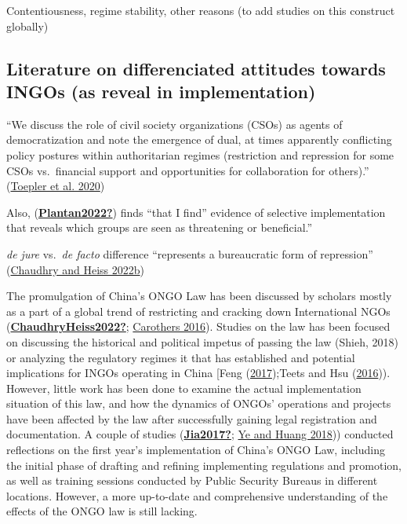 \documentclass[
]{article}
\begin{document}
Contentiousness, regime stability, other reasons (to add studies on this
construct globally)

\hypertarget{literature-on-differenciated-attitudes-towards-ingos-as-reveal-in-implementation}{%
\subsection{Literature on differenciated attitudes towards INGOs (as
reveal in
implementation)}\label{literature-on-differenciated-attitudes-towards-ingos-as-reveal-in-implementation}}

``We discuss the role of civil society organizations (CSOs) as agents of
democratization and note the emergence of dual, at times apparently
conflicting policy postures within authoritarian regimes (restriction
and repression for some CSOs vs.~financial support and opportunities for
collaboration for others).''
(\protect\hyperlink{ref-ToeplerZimmerFrohlich:2020}{Toepler et al.
2020})

Also, (\protect\hyperlink{ref-Plantan2022}{\textbf{Plantan2022?}}) finds
``that I find'' evidence of selective implementation that reveals which
groups are seen as threatening or beneficial.''

\emph{de jure} vs.~\emph{de facto} difference ``represents a
bureaucratic form of repression''
(\protect\hyperlink{ref-ChaudhryHeiss:2022}{Chaudhry and Heiss 2022b})

The promulgation of China's ONGO Law has been discussed by scholars
mostly as a part of a global trend of restricting and cracking down
International NGOs
(\protect\hyperlink{ref-ChaudhryHeiss2022}{\textbf{ChaudhryHeiss2022?}};
\protect\hyperlink{ref-Carothers:2016}{Carothers 2016}). Studies on the
law has been focused on discussing the historical and political impetus
of passing the law (Shieh, 2018) or analyzing the regulatory regimes it
that has established and potential implications for INGOs operating in
China {[}Feng (\protect\hyperlink{ref-Feng:2017}{2017});Teets and Hsu
(\protect\hyperlink{ref-TeetsHsu:2016}{2016})). However, little work has
been done to examine the actual implementation situation of this law,
and how the dynamics of ONGOs' operations and projects have been
affected by the law after successfully gaining legal registration and
documentation. A couple of studies
(\protect\hyperlink{ref-Jia2017}{\textbf{Jia2017?}};
\protect\hyperlink{ref-YeHuang:2018}{Ye and Huang 2018})) conducted
reflections on the first year's implementation of China's ONGO Law,
including the initial phase of drafting and refining implementing
regulations and promotion, as well as training sessions conducted by
Public Security Bureaus in different locations. However, a more
up-to-date and comprehensive understanding of the effects of the ONGO
law is still lacking.
\end{document}
